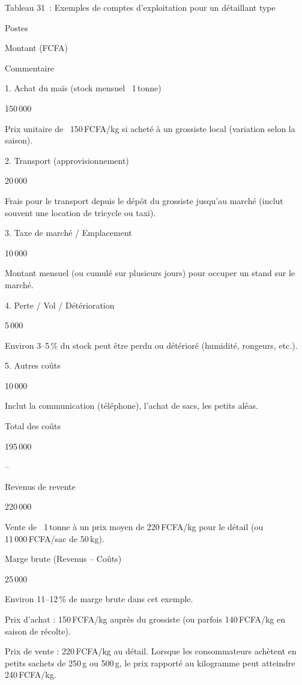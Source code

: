 \documentclass[12pt,oneside]{report}
\begin{document}
Tableau 31 : Exemples de comptes d’exploitation pour un détaillant type

Postes

Montant (FCFA)

Commentaire

1. Achat du maïs (stock mensuel ~1 tonne)

150 000

Prix unitaire de ~150 FCFA/kg si acheté à un grossiste local (variation selon la saison).

2. Transport (approvisionnement)

20 000

Frais pour le transport depuis le dépôt du grossiste jusqu’au marché (inclut souvent une location de tricycle ou taxi).

3. Taxe de marché / Emplacement

10 000

Montant mensuel (ou cumulé sur plusieurs jours) pour occuper un stand sur le marché.

4. Perte / Vol / Détérioration

5 000

Environ 3–5 \% du stock peut être perdu ou détérioré (humidité, rongeurs, etc.).

5. Autres coûts

10 000

Inclut la communication (téléphone), l’achat de sacs, les petits aléas.

Total des coûts

195 000

–

Revenus de revente

220 000

Vente de ~1 tonne à un prix moyen de 220 FCFA/kg pour le détail (ou 11 000 FCFA/sac de 50 kg).

Marge brute (Revenus – Coûts)

25 000

Environ 11–12 \% de marge brute dans cet exemple.

Prix d’achat : 150 FCFA/kg auprès du grossiste (ou parfois 140 FCFA/kg en saison de récolte).

Prix de vente : 220 FCFA/kg au détail. Lorsque les consommateurs achètent en petits sachets de 250 g ou 500 g, le prix rapporté au kilogramme peut atteindre 240 FCFA/kg.
\end{document}
